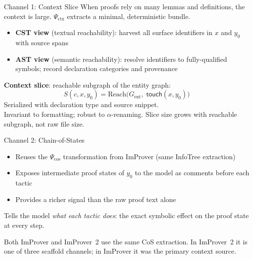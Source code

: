 \documentclass{beamer}
\begin{document}
\begin{frame}{Channel 1: Context Slice}
\vspace{0.4em}
When proofs rely on many lemmas and definitions, the context is large. $\Psi_{\mathrm{ctx}}$ extracts a minimal, deterministic bundle.
\vspace{0.4em}
\begin{itemize}\setlength{\itemsep}{6pt}
  \item \textbf{CST view} (textual reachability): harvest all surface identifiers in $x$ and $y_0$ with source spans
  \item \textbf{AST view} (semantic reachability): resolve identifiers to fully-qualified symbols; record declaration categories and provenance
\end{itemize}
\vspace{0.3em}

\textbf{Context slice}: reachable subgraph of the entity graph:
\[
  S(c,x,y_0) = \mathrm{Reach}\bigl(G_{\mathrm{ent}},\; \mathsf{touch}(x,y_0)\bigr)
\]
Serialized with declaration type and source snippet.\\[0.3em]
\small Invariant to formatting; robust to $\alpha$-renaming. Slice size grows with reachable subgraph, not raw file size.
\end{frame}

\begin{frame}{Channel 2: Chain-of-States}
\vspace{0.8em}
\begin{itemize}\setlength{\itemsep}{10pt}
  \item Reuses the $\Psi_{\mathrm{cos}}$ transformation from ImProver (same InfoTree extraction)
  \item Exposes intermediate proof states of $y_0$ to the model as comments before each tactic
  \item Provides a richer signal than the raw proof text alone
\end{itemize}
\vspace{0.8em}
\begin{exampleblock}{}
  Tells the model \emph{what each tactic does}: the exact symbolic effect on the proof state at every step.
\end{exampleblock}
\vspace{0.5em}
\small Both ImProver and ImProver~2 use the same CoS extraction. In ImProver~2 it is one of three scaffold channels; in ImProver it was the primary context source.
\end{frame}
\end{document}
